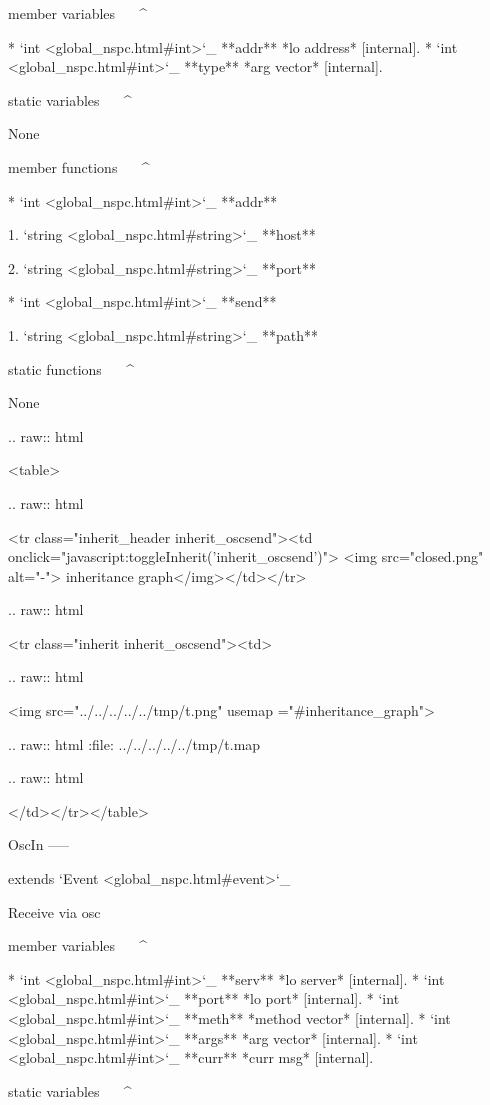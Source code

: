 member variables
^^^^^^^^^^^^^^^^

	* `int <global_nspc.html#int>`_ **addr** *lo address*  [internal].
	* `int <global_nspc.html#int>`_ **type** *arg vector*  [internal].


static variables
^^^^^^^^^^^^^^^^

	None

member functions
^^^^^^^^^^^^^^^^

	* `int <global_nspc.html#int>`_ **addr**

		1. `string <global_nspc.html#string>`_ **host**

		2. `string <global_nspc.html#string>`_ **port**

	* `int <global_nspc.html#int>`_ **send**

		1. `string <global_nspc.html#string>`_ **path**

static functions
^^^^^^^^^^^^^^^^


	None


  .. raw:: html

   <table>


  .. raw:: html

   <tr class="inherit_header inherit_oscsend"><td onclick="javascript:toggleInherit('inherit_oscsend')"> <img src="closed.png" alt="-"> inheritance graph</img></td></tr>


  .. raw:: html

   <tr class="inherit inherit_oscsend"><td>


  .. raw:: html

   <img src="../../../../../tmp/t.png" usemap ="#inheritance_graph">


  .. raw:: html
   :file:   ../../../../../tmp/t.map


  .. raw:: html

   </td></tr></table>

OscIn
-----

extends `Event <global_nspc.html#event>`_ 

Receive via osc

member variables
^^^^^^^^^^^^^^^^

	* `int <global_nspc.html#int>`_ **serv** *lo server*  [internal].
	* `int <global_nspc.html#int>`_ **port** *lo port*  [internal].
	* `int <global_nspc.html#int>`_ **meth** *method vector*  [internal].
	* `int <global_nspc.html#int>`_ **args** *arg vector*  [internal].
	* `int <global_nspc.html#int>`_ **curr** *curr msg*  [internal].


static variables
^^^^^^^^^^^^^^^^

